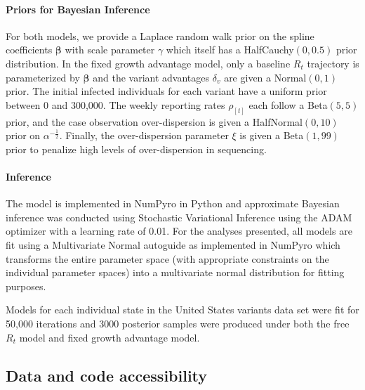 \documentclass[11pt,oneside,letterpaper]{article}
\renewcommand{\vec}[1]{\boldsymbol{#1}}
\begin{document}
\paragraph{Priors for Bayesian Inference}%

For both models, we provide a Laplace random walk prior on the spline coefficients $\vec{\beta}$ with scale parameter $\gamma$ which itself has a HalfCauchy$(0,0.5)$ prior distribution.
In the fixed growth advantage model, only a baseline $R_{t}$ trajectory is parameterized by $\vec{\beta}$ and the variant advantages $\delta_{v}$ are given a Normal$(0,1)$ prior.
The initial infected individuals for each variant have a uniform prior between 0 and 300,000.
The weekly reporting rates $\rho_{[t]}$ each follow a Beta$(5, 5)$ prior, and the case observation over-dispersion is given a HalfNormal$(0, 10)$ prior on $\alpha^{-\frac{1}{2}}$.
Finally, the over-dispersion parameter $\xi$ is given a Beta$(1, 99)$ prior to penalize high levels of over-dispersion in sequencing.

\paragraph{Inference}

The model is implemented in NumPyro \cite{phan2019composable} in Python and approximate Bayesian inference was conducted using Stochastic Variational Inference \cite{hoffman2013svi} using the ADAM optimizer \cite{kingma2017adam} with a learning rate of 0.01. For the analyses presented, all models are fit using a Multivariate Normal autoguide as implemented in NumPyro \cite{phan2019composable} which transforms the entire parameter space (with appropriate constraints on the individual parameter spaces) into a multivariate normal distribution for fitting purposes.

Models for each individual state in the United States variants data set were fit for 50,000 iterations and 3000 posterior samples were produced under both the free $R_{t}$ model and fixed growth advantage model.

\subsection*{Data and code accessibility}
\end{document}
